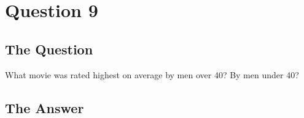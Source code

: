 \section{Question 9}

\subsection{The Question}

\begin{flushleft}

What movie was rated highest on average by men over 40? By men
under 40?

\end{flushleft}
\subsection{The Answer}
